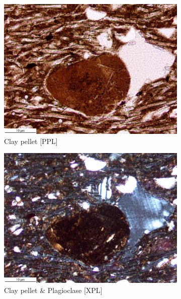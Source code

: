 \documentclass[a4paper]{article}
\begin{document}
\begin{figure}[H]
\begin{subfigure}[t]{.49\textwidth}
		\includegraphics[width=\textwidth]{ThinSections/107-2_20x_PPL.jpg}
		\caption{Clay pellet [PPL]}
	\end{subfigure}\hspace{.5em}\hfill
	\begin{subfigure}[t]{.49\textwidth}
		\includegraphics[width=\textwidth]{ThinSections/107-2_20x_XPL.jpg}
		\caption{Clay pellet \& Plagioclase [XPL]}
	\end{subfigure}
	\caption{}
	\label{fig:107_mun}
\end{figure}
\end{document}
